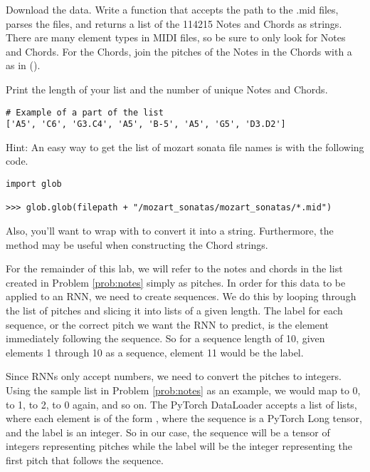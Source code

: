 \begin{problem}
Download the data.
Write a function that accepts the path to the .mid files, parses the files, and returns a list of the 114215 Notes and Chords as strings. 
There are many element types in MIDI files, so be sure to only look for Notes and Chords.
For the Chords, join the pitches of the Notes in the Chords with a  as in ().

Print the length of your list and the number of unique Notes and Chords.

\begin{lstlisting}
# Example of a part of the list
['A5', 'C6', 'G3.C4', 'A5', 'B-5', 'A5', 'G5', 'D3.D2']
\end{lstlisting}
Hint: An easy way to get the list of mozart sonata file names is with the following code.
\begin{lstlisting}
import glob

>>> glob.glob(filepath + "/mozart_sonatas/mozart_sonatas/*.mid")
\end{lstlisting}
Also, you'll want to wrap  with  to convert it into a string.
Furthermore, the  method may be useful when constructing the Chord strings.

\label{prob:notes}
\end{problem}

For the remainder of this lab, we will refer to the notes and chords in the list created in Problem \ref{prob:notes} simply as pitches.
In order for this data to be applied to an RNN, we need to create sequences.
We do this by looping through the list of pitches and slicing it into lists of a given length.
The label for each sequence, or the correct pitch we want the RNN to predict, is the element immediately following the sequence.
So for a sequence length of 10, given elements 1 through 10 as a sequence, element 11 would be the label.

Since RNNs only accept numbers, we need to convert the pitches to integers.
Using the sample list in Problem \ref{prob:notes} as an example, we would map  to 0,  to 1,  to 2,  to 0 again, and so on.
The PyTorch DataLoader accepts a list of lists, where each element is of the form , where the sequence is a PyTorch Long tensor, and the label is an integer.
So in our case, the sequence will be a tensor of integers representing pitches while the label will be the integer representing the first pitch that follows the sequence.

